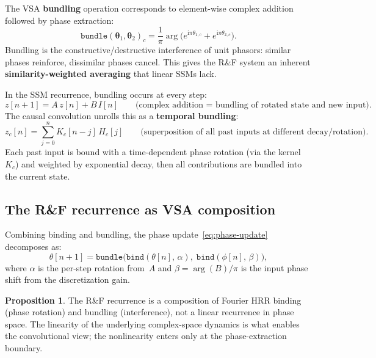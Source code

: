 \documentclass[11pt]{article}
\newcommand{\im}{\mathrm{i}}
\theoremstyle{definition}
\newtheorem{proposition}{Proposition}
\begin{document}
The VSA \textbf{bundling} operation corresponds to element-wise complex
addition followed by phase extraction:
\begin{equation}\label{eq:bundle}
  \texttt{bundle}(\bm\theta_1, \bm\theta_2)_c
    = \frac{1}{\pi}\arg\!\bigl(
        e^{\im\pi\theta_{1,c}} + e^{\im\pi\theta_{2,c}}
      \bigr).
\end{equation}
Bundling is the constructive/destructive interference of unit phasors:
similar phases reinforce, dissimilar phases cancel. This gives the
R\&F system an inherent \textbf{similarity-weighted averaging} that
linear SSMs lack.

In the SSM recurrence, bundling occurs at every step:
\begin{equation}
  z[n+1] = A\,z[n] + B\,I[n]
  \qquad\text{(complex addition = bundling of rotated state and new input)}.
\end{equation}
The causal convolution unrolls this as a \textbf{temporal bundling}:
\begin{equation}\label{eq:temporal-bundle}
  z_c[n] = \sum_{j=0}^{n} K_c[n-j]\,H_c[j]
  \qquad\text{(superposition of all past inputs at different decay/rotation)}.
\end{equation}
Each past input is bound with a time-dependent phase rotation
(via the kernel~$K_c$) and weighted by exponential decay, then all
contributions are bundled into the current state.

\subsection{The R\&F recurrence as VSA composition}

Combining binding and bundling, the phase update~\eqref{eq:phase-update}
decomposes as:
\begin{equation}\label{eq:vsa-recurrence}
  \theta[n+1]
    = \texttt{bundle}\!\bigl(
        \texttt{bind}(\theta[n],\,\alpha),\;
        \texttt{bind}(\phi[n],\,\beta)
      \bigr),
\end{equation}
where $\alpha$ is the per-step rotation from~$A$ and
$\beta = \arg(B)/\pi$ is the input phase shift from the discretization
gain.

\begin{proposition}
The R\&F recurrence is a composition of Fourier HRR binding
(phase rotation) and bundling (interference), not a linear recurrence
in phase space. The linearity of the underlying complex-space dynamics
is what enables the convolutional view; the nonlinearity enters only at
the phase-extraction boundary.
\end{proposition}
\end{document}
